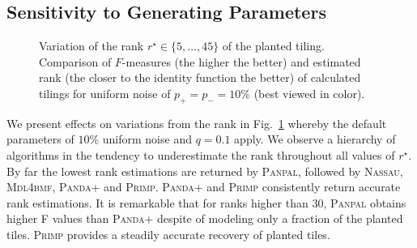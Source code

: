 \subsection{Sensitivity to Generating Parameters}\label{sec:PR:SynthParamSensitivity}
\begin{figure}
\centering

\caption{Variation of the rank $r^\star\in\{5,\ldots,45\}$ of the planted tiling. Comparison of $F$-measures (the higher the better) and estimated rank (the closer to the identity function the better) of calculated tilings for uniform noise of $p_+=p_-=10\%$ (best viewed in color).}
\label{fig:rank}
\end{figure}
We present effects on variations from the rank in Fig.~\ref{fig:rank} whereby the default parameters of $10\%$ uniform noise and $q=0.1$ apply. We observe a hierarchy of algorithms in the tendency to underestimate the rank throughout all values of $r^\star$. By far the lowest rank estimations are returned by \textsc{Panpal}, followed by \textsc{Nassau}, \textsc{Mdl4bmf}, \textsc{Panda+} and \textsc{Primp}. \textsc{Panda+} and \textsc{Primp} consistently return accurate rank estimations. It is remarkable that for ranks higher than 30, \textsc{Panpal} obtains higher F values than \textsc{Panda+} despite of modeling only a fraction of the planted tiles. \textsc{Primp} provides a steadily accurate recovery of planted tiles.

